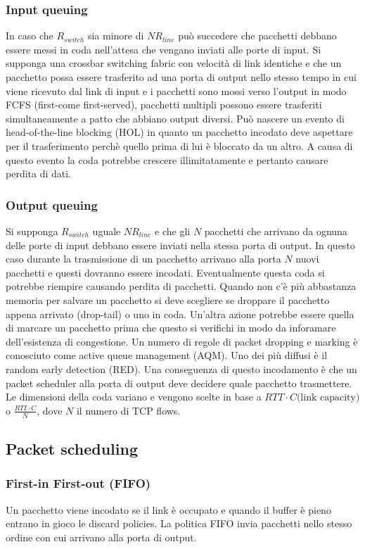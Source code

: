 \subsubsection{Input queuing}
In caso che $R_{switch}$ sia minore di $NR_{line}$ pu\`o succedere che pacchetti debbano essere messi in coda nell'attesa che vengano inviati alle porte di
input. Si supponga una crossbar switching fabric con velocit\`a di link identiche e che un pacchetto possa essere trasferito ad una porta di output nello
stesso tempo in cui viene ricevuto dal link di input e i pacchetti sono mossi verso l'output in modo FCFS (first-come first-served), pacchetti multipli 
possono essere trasferiti simultaneamente a patto che abbiano output diversi. Pu\`o nascere un evento di head-of-the-line blocking (HOL) in quanto un 
pacchetto incodato deve aspettare per il trasferimento perch\`e quello prima di lui \`e bloccato da un altro. A causa di questo evento la coda potrebbe 
crescere illimitatamente e pertanto causare perdita di dati.
\subsubsection{Output queuing}
Si supponga $R_{switch}$ uguale  $NR_{line}$ e che gli $N$ pacchetti che arrivano da ognuna delle porte di input debbano essere inviati nella stessa porta 
di output. In questo caso durante la trasmissione di un pacchetto arrivano alla porta $N$ nuovi pacchetti e questi dovranno essere incodati. Eventualmente
questa coda si potrebbe riempire causando perdita di pacchetti. Quando non c'\`e pi\`u abbastanza memoria per salvare un pacchetto si deve scegliere se 
droppare il pacchetto appena arrivato (drop-tail) o uno in coda. Un'altra azione potrebbe essere quella di marcare un pacchetto prima che questo si 
verifichi in modo da inforamare dell'esistenza di congestione. Un numero di regole di packet dropping e marking \`e conosciuto come active queue management
(AQM). Uno dei pi\`u diffusi \`e il random early detection (RED). Una conseguenza di questo incodamento \`e che un packet scheduler alla porta di output 
deve decidere quale pacchetto trasmettere. Le dimensioni della coda variano e vengono scelte in base  a $RTT\cdot C\text{(link capacity)}$ o $\frac{RTI\cdot 
C}{N}$, dove $N$ il numero di TCP flows.
\subsection{Packet scheduling}
\subsubsection{First-in First-out (FIFO)}
Un pacchetto viene incodato se il link \`e occupato e quando il buffer \`e pieno entrano in gioco le discard policies. La politica FIFO invia pacchetti 
nello stesso ordine con cui arrivano alla porta di output. 
